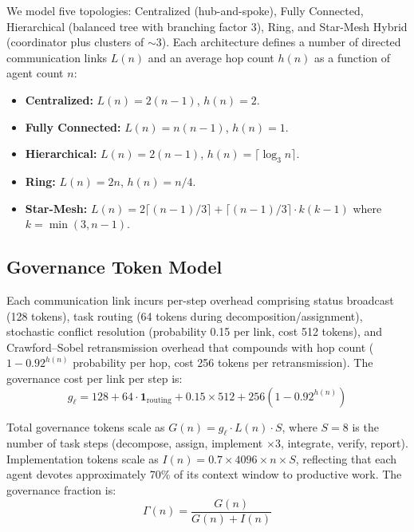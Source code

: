 \documentclass[11pt,a4paper]{article}
\begin{document}
We model five topologies: Centralized (hub-and-spoke), Fully Connected, Hierarchical (balanced tree with branching factor 3), Ring, and Star-Mesh Hybrid (coordinator plus clusters of $\sim$3). Each architecture defines a number of directed communication links $L(n)$ and an average hop count $h(n)$ as a function of agent count $n$:

\begin{itemize}
\item \textbf{Centralized:} $L(n) = 2(n-1)$, $h(n) = 2$.
\item \textbf{Fully Connected:} $L(n) = n(n-1)$, $h(n) = 1$.
\item \textbf{Hierarchical:} $L(n) = 2(n-1)$, $h(n) = \lceil \log_3 n \rceil$.
\item \textbf{Ring:} $L(n) = 2n$, $h(n) = n/4$.
\item \textbf{Star-Mesh:} $L(n) = 2\lceil(n-1)/3\rceil + \lceil(n-1)/3\rceil \cdot k(k-1)$ where $k = \min(3, n-1)$.
\end{itemize}

\subsection{Governance Token Model}

Each communication link incurs per-step overhead comprising status broadcast (128 tokens), task routing (64 tokens during decomposition/assignment), stochastic conflict resolution (probability 0.15 per link, cost 512 tokens), and Crawford--Sobel retransmission overhead that compounds with hop count ($1 - 0.92^{h(n)}$ probability per hop, cost 256 tokens per retransmission). The governance cost per link per step is:
\begin{equation}
\label{eq:gov-cost}
g_{\ell} = 128 + 64 \cdot \mathbf{1}_{\text{routing}} + 0.15 \times 512 + 256(1 - 0.92^{h(n)})
\end{equation}

Total governance tokens scale as $G(n) = g_{\ell} \cdot L(n) \cdot S$, where $S = 8$ is the number of task steps (decompose, assign, implement $\times 3$, integrate, verify, report). Implementation tokens scale as $I(n) = 0.7 \times 4096 \times n \times S$, reflecting that each agent devotes approximately 70\% of its context window to productive work. The governance fraction is:
\begin{equation}
\label{eq:gov-frac}
\Gamma(n) = \frac{G(n)}{G(n) + I(n)}
\end{equation}
\end{document}
